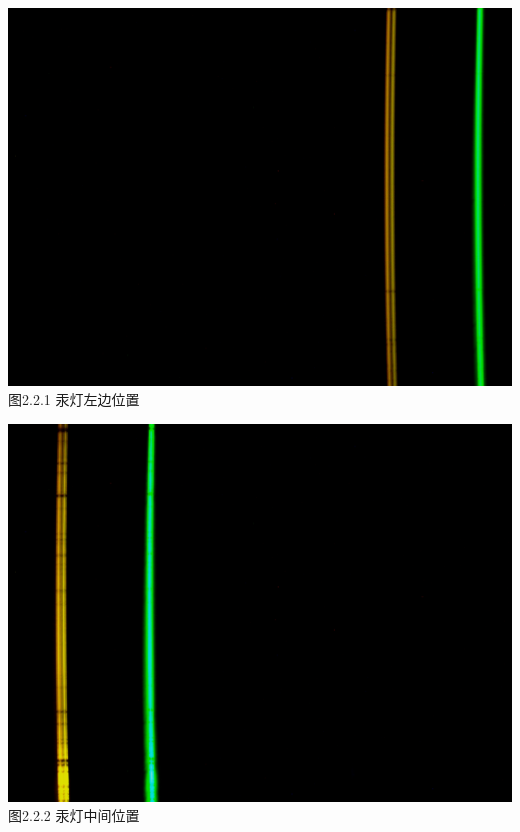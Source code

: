 \documentclass{ctexart}
\begin{document}
~\\
\begin{minipage}[c]{0.33\textwidth}
    \includegraphics[scale=0.05]{1-2} \\\small{图2.2.1 汞灯左边位置}\centering
\end{minipage}
\begin{minipage}[c]{0.33\textwidth}
    \includegraphics[scale=0.05]{2-2} \\\small{图2.2.2 汞灯中间位置}\centering
\end{minipage}
\end{document}
